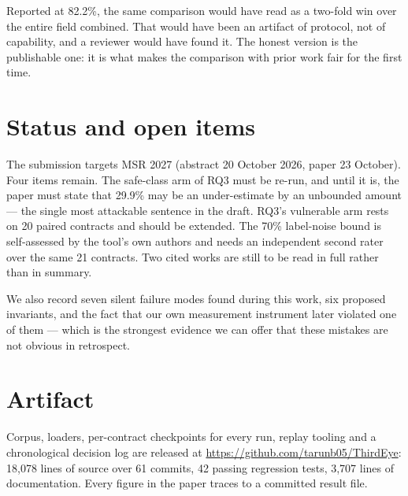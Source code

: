 \documentclass[sigconf,nonacm]{acmart}
\begin{document}
Reported at 82.2\%, the same comparison would have read as a two-fold win over the
entire field combined. That would have been an artifact of protocol, not of
capability, and a reviewer would have found it. The honest version is the
publishable one: it is what makes the comparison with prior work fair for the
first time.

\section{Status and open items}

The submission targets MSR 2027 (abstract 20 October 2026, paper 23 October). Four
items remain. The safe-class arm of RQ3 must be re-run, and until it is, the
paper must state that 29.9\% may be an under-estimate by an unbounded amount ---
the single most attackable sentence in the draft. RQ3's vulnerable arm rests on 20
paired contracts and should be extended. The 70\% label-noise bound is
self-assessed by the tool's own authors and needs an independent second rater over
the same 21 contracts. Two cited works are still to be read in full rather than
in summary.

We also record seven silent failure modes found during this work, six proposed
invariants, and the fact that our own measurement instrument later violated one of
them --- which is the strongest evidence we can offer that these mistakes are not
obvious in retrospect.

\section{Artifact}

Corpus, loaders, per-contract checkpoints for every run, replay tooling and a
chronological decision log are released at
\url{https://github.com/tarunb05/ThirdEye}: 18,078 lines of source over 61
commits, 42 passing regression tests, 3,707 lines of documentation. Every figure
in the paper traces to a committed result file.



\end{document}
